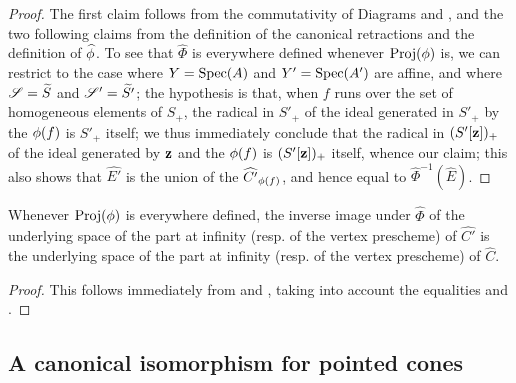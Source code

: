 \begin{proof}
The first claim follows from the commutativity of Diagrams  and , and the two following claims from the definition of the canonical retractions  and the definition of $\widehat{\phi}$.
To see that $\widehat{\Phi}$ is everywhere defined whenever $\operatorname{Proj}(\phi)$ is, we can restrict to the case where $Y=\operatorname{Spec}(A)$ and $Y'=\operatorname{Spec}(A')$ are affine, and where $\mathscr{S}=\widetilde{S}$ and $\mathscr{S}'=\widetilde{S'}$;
the hypothesis is that, when $f$ runs over the set of homogeneous elements of $S_+$, the radical in $S'_+$ of the ideal generated in $S'_+$ by the $\phi(f)$ is $S'_+$ itself;
we thus immediately conclude that the radical in $(S'[\mathbf{z}])_+$ of the ideal generated by $\mathbf{z}$ and the $\phi(f)$ is $(S'[\mathbf{z}])_+$ itself, whence our claim;
this also shows that $\widehat{E'}$ is the union of the $\widehat{C'}_{\phi(f)}$, and hence equal to $\widehat{\Phi}^{-1}(\widehat{E})$.
\end{proof}

\begin{corollary}[8.5.5]
\label{II.8.5.5}
Whenever $\operatorname{Proj}(\phi)$ is everywhere defined, the inverse image under $\widehat{\Phi}$ of the underlying space of the part at infinity (resp. of the vertex prescheme) of $\widehat{C'}$ is the underlying space of the part at infinity (resp. of the vertex prescheme) of $\widehat{C}$.
\end{corollary}

\begin{proof}
This follows immediately from  and , taking into account the equalities  and .
\end{proof}


\subsection{A canonical isomorphism for pointed cones}
\label{subsection:II.8.6}


